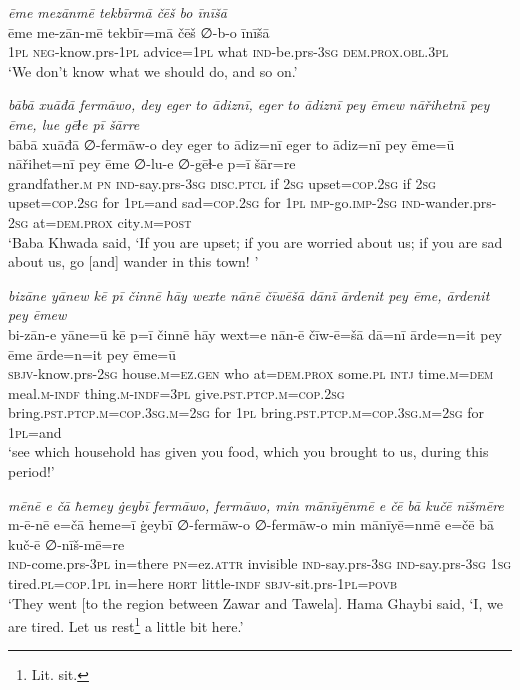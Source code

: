 \ea \label{BP.157}
\textit{ēme mezānmē tekbīrmā čēš bo īnīšā} \\ 
\gll ēme me-zān-mē tekbīr=mā čēš ∅-b-o īnīšā \\ 
 \textsc{1pl} \textsc{neg-}know.prs\textsc{-\textsc{1pl}} advice\textsc{=\textsc{1pl}} what \textsc{ind-}be.prs\textsc{-3sg} \textsc{dem.prox}\textsc{.obl}\textsc{.3pl} \\ 
\glt `We don’t know what we should do, and so on.'
\z 
 
\ea \label{BP.160}
\textit{bābā xuāđā fermāwo, dey eger to ādiznī, eger to ādiznī pey ēmew nāřihetnī pey ēme, lue gēɫe pī šārre} \\ 
\gll bābā xuāđā ∅-fermāw-o dey eger to ādiz=nī eger to ādiz=nī pey ēme=ū nāřihet=nī pey ēme ∅-lu-e ∅-gēɫ-e p=ī šār=re \\ 
 grandfather\textsc{.m} \textsc{pn} \textsc{ind-}say.prs\textsc{-3sg} \textsc{disc.ptcl} if \textsc{2sg} upset\textsc{=cop}\textsc{.\textsc{2sg}} if \textsc{2sg} upset\textsc{=cop}\textsc{.\textsc{2sg}} for \textsc{1pl}=and sad\textsc{=cop}\textsc{.\textsc{2sg}} for \textsc{1pl} \textsc{imp-}go.\textsc{imp-}\textsc{2sg} \textsc{ind-}wander.prs-\textsc{2sg} at=\textsc{dem.prox} city\textsc{.m}\textsc{=\textsc{post}} \\ 
\glt `Baba Khwada said, ‘If you are upset; if you are worried about us; if you are sad about us, go [and] wander in this town! '
\z 
 
\ea \label{BP.161}
\textit{bizāne yānew kē pī činnē hāy wexte nānē čīwēšā dānī ārdenit pey ēme, ārdenit pey ēmew} \\ 
\gll bi-zān-e yāne=ū kē p=ī činnē hāy wext=e nān-ē čīw-ē=šā dā=nī ārde=n=it pey ēme ārde=n=it pey ēme=ū \\ 
 \textsc{sbjv-}know.prs-\textsc{2sg} house\textsc{.m}\textsc{=ez.gen} who at=\textsc{dem.prox} some\textsc{.pl} \textsc{intj} time\textsc{.m}\textsc{=dem} meal\textsc{.m}\textsc{-indf} thing\textsc{.m}\textsc{-indf}\textsc{=3pl} give\textsc{.pst}\textsc{.ptcp}\textsc{.m}\textsc{=cop}\textsc{.\textsc{2sg}} bring\textsc{.pst}\textsc{.ptcp}\textsc{.m}\textsc{=cop}\textsc{.3sg}\textsc{.m}\textsc{=\textsc{2sg}} for \textsc{1pl} bring\textsc{.pst}\textsc{.ptcp}\textsc{.m}\textsc{=cop}\textsc{.3sg}\textsc{.m}\textsc{=\textsc{2sg}} for \textsc{1pl}=and \\ 
\glt `see which household has given you food, which you brought to us, during this period!'
\z 
 
\ea \label{BP.181}
\textit{mēnē e čā ħemey ġeybī fermāwo, fermāwo, min mānīyēnmē e čē bā kučē nīšmēre} \\ 
\gll m-ē-nē e=čā ħeme=ī ġeybī ∅-fermāw-o ∅-fermāw-o min mānīyē=nmē e=čē bā kuč-ē ∅-nīš-mē=re \\ 
 \textsc{ind-}come.prs\textsc{-3pl} in=there \textsc{pn}=ez.\textsc{attr} invisible \textsc{ind-}say.prs\textsc{-3sg} \textsc{ind-}say.prs\textsc{-3sg} \textsc{1sg} tired\textsc{.pl}\textsc{=cop}\textsc{.\textsc{1pl}} in=here \textsc{hort} little\textsc{-indf} \textsc{sbjv-}sit.prs\textsc{-\textsc{1pl}}\textsc{=\textsc{povb}} \\ 
\glt `They went [to the region between Zawar and Tawela]. Hama Ghaybi said, ‘I, we are tired. Let us rest\footnote{Lit. sit.} a little bit here.'
\z 
 
